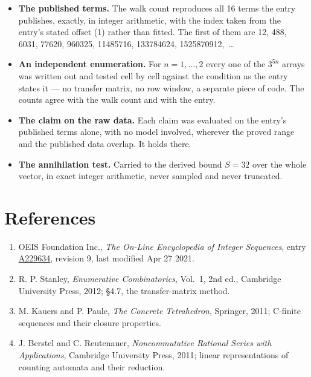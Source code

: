 \documentclass[11pt]{article}
\theoremstyle{definition}
\begin{document}
\begin{itemize}

\item {\bfseries The published terms.} The walk count reproduces all 16 terms the entry publishes, exactly, in integer arithmetic, with the index taken from the entry's stated offset (1) rather than fitted. The first of them are 12, 488, 6031, 77620, 960325, 11485716, 133784624, 1525870912,~\dots

\item {\bfseries An independent enumeration.} For $n = 1,\dots,2$ every one of the $3^{5n}$ arrays was written out and tested cell by cell against the condition as the entry states it --- no transfer matrix, no row window, a separate piece of code. The counts agree with the walk count and with the entry.

\item {\bfseries The claim on the raw data.} Each claim was evaluated on the entry's published terms alone, with no model involved, wherever the proved range and the published data overlap. It holds there.

\item {\bfseries The annihilation test.} Carried to the derived bound $S = 32$ over the whole vector, in exact integer arithmetic, never sampled and never truncated.

\end{itemize}

\section{References}

\begin{enumerate}

\item OEIS Foundation Inc., \emph{The On-Line Encyclopedia of Integer Sequences}, entry \href{https://oeis.org/A229634}{A229634}, revision 9, last modified Apr 27 2021.

\item R. P. Stanley, \emph{Enumerative Combinatorics}, Vol.~1, 2nd ed., Cambridge University Press, 2012; \S4.7, the transfer-matrix method.

\item M. Kauers and P. Paule, \emph{The Concrete Tetrahedron}, Springer, 2011; C-finite sequences and their closure properties.

\item J. Berstel and C. Reutenauer, \emph{Noncommutative Rational Series with Applications}, Cambridge University Press, 2011; linear representations of counting automata and their reduction.

\end{enumerate}
\end{document}
